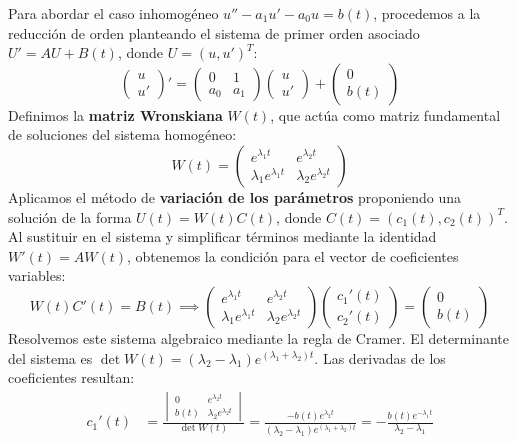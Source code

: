 {    Para abordar el caso inhomogéneo $u'' - a_1 u' - a_0 u = b(t)$, procedemos a la reducción de orden planteando el sistema de primer orden asociado $U' = A U + B(t)$, donde $U = (u, u')^T$:
    \[ \begin{pmatrix} u \\ u' \end{pmatrix}' = \begin{pmatrix} 0 & 1 \\ a_0 & a_1 \end{pmatrix} \begin{pmatrix} u \\ u' \end{pmatrix} + \begin{pmatrix} 0 \\ b(t) \end{pmatrix} \]
    Definimos la \textbf{matriz Wronskiana} $W(t)$, que actúa como matriz fundamental de soluciones del sistema homogéneo:
    \[ W(t) = \begin{pmatrix} e^{\lambda_1 t} & e^{\lambda_2 t} \\ \lambda_1 e^{\lambda_1 t} & \lambda_2 e^{\lambda_2 t} \end{pmatrix} \]
    Aplicamos el método de \textbf{variación de los parámetros} proponiendo una solución de la forma $U(t) = W(t)C(t)$, donde $C(t) = (c_1(t), c_2(t))^T$. Al sustituir en el sistema y simplificar términos mediante la identidad $W'(t) = AW(t)$, obtenemos la condición para el vector de coeficientes variables:
    \[ W(t)C'(t) = B(t) \implies \begin{pmatrix} e^{\lambda_1 t} & e^{\lambda_2 t} \\ \lambda_1 e^{\lambda_1 t} & \lambda_2 e^{\lambda_2 t} \end{pmatrix} \begin{pmatrix} c_1'(t) \\ c_2'(t) \end{pmatrix} = \begin{pmatrix} 0 \\ b(t) \end{pmatrix} \]
    Resolvemos este sistema algebraico mediante la regla de Cramer. El determinante del sistema es $\det W(t) = (\lambda_2 - \lambda_1)e^{(\lambda_1 + \lambda_2)t}$. Las derivadas de los coeficientes resultan:
    \begin{align*}
    c_1'(t) &= \frac{\begin{vmatrix} 0 & e^{\lambda_2 t} \\ b(t) & \lambda_2 e^{\lambda_2 t} \end{vmatrix}}{\det W(t)} = \frac{-b(t)e^{\lambda_2 t}}{(\lambda_2 - \lambda_1)e^{(\lambda_1+\lambda_2)t}} = -\frac{b(t)e^{-\lambda_1 t}}{\lambda_2 - \lambda_1} \\

\end{align*}}
